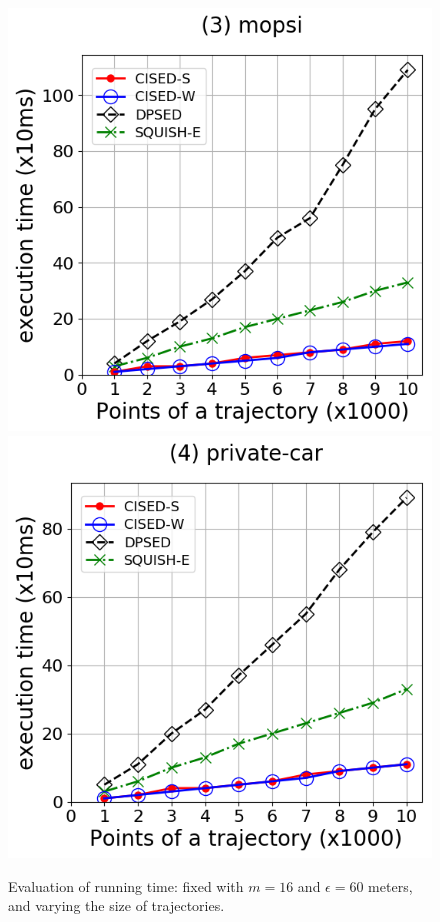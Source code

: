 {\begin{figure}[tb!]
\includegraphics[scale = 0.290]{Figures/Exp-time-size-mopsi.png}\hspace{1ex}
\includegraphics[scale = 0.290]{Figures/Exp-time-size-private.png}
\caption{\small Evaluation of running time: fixed with $m=16$ and $\epsilon=60$ meters, and varying the size of trajectories. }
\label{fig:time-size}
\vspace{-1ex}
\end{figure}







}
